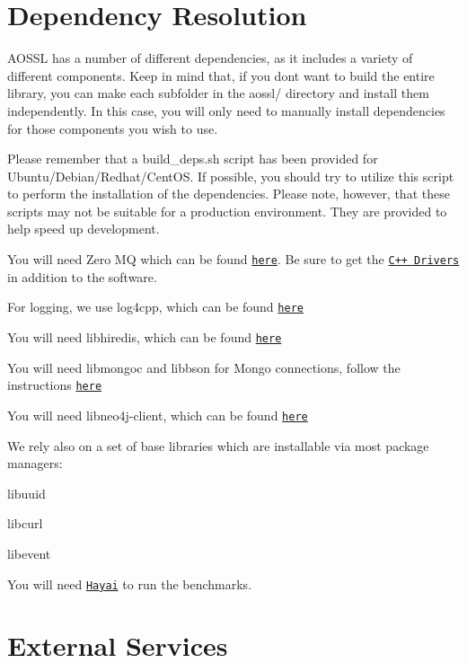 \section*{Dependency Resolution}

A\+O\+S\+SL has a number of different dependencies, as it includes a variety of different components. Keep in mind that, if you don\textquotesingle{}t want to build the entire library, you can make each subfolder in the aossl/ directory and install them independently. In this case, you will only need to manually install dependencies for those components you wish to use.

Please remember that a build\+\_\+deps.\+sh script has been provided for Ubuntu/\+Debian/\+Redhat/\+Cent\+OS. If possible, you should try to utilize this script to perform the installation of the dependencies. Please note, however, that these scripts may not be suitable for a production environment. They are provided to help speed up development.

You will need Zero MQ which can be found \href{http://zeromq.org/intro:get-the-software}{\tt here}. Be sure to get the \href{https://github.com/zeromq/cppzmq}{\tt C++ Drivers} in addition to the software.

For logging, we use log4cpp, which can be found \href{http://log4cpp.sourceforge.net/}{\tt here}

You will need libhiredis, which can be found \href{https://github.com/redis/hiredis}{\tt here}

You will need libmongoc and libbson for Mongo connections, follow the instructions \href{http://mongoc.org/libmongoc/1.3.0/installing.html}{\tt here}

You will need libneo4j-\/client, which can be found \href{https://github.com/cleishm/libneo4j-client/}{\tt here}

We rely also on a set of base libraries which are installable via most package managers\+:
\begin{DoxyItemize}
\item libuuid
\item libcurl
\item libevent
\end{DoxyItemize}

You will need \href{https://github.com/nickbruun/hayai}{\tt Hayai} to run the benchmarks.

\section*{External Services}

